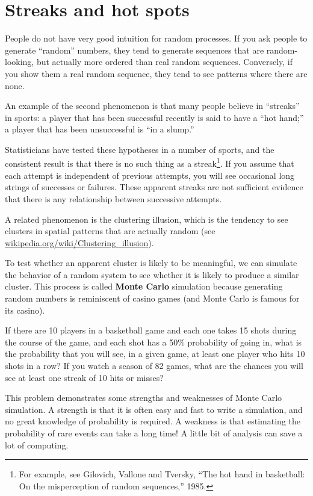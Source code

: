 \documentclass[12pt]{book}
\begin{document}
\section{Streaks and hot spots}

People do not have very good intuition for random processes.  If you
ask people to generate ``random'' numbers, they tend to generate
sequences that are random-looking, but actually more ordered than real
random sequences.  Conversely, if you show them a real random
sequence, they tend to see patterns where there are none.

An example of the second phenomenon is that many people believe
in ``streaks'' in sports: a player that has been successful recently
is said to have a ``hot hand;'' a player that has been unsuccessful is
``in a slump.''


Statisticians have tested these hypotheses in a number of sports, and
the consistent result is that there is no such thing as a
streak\footnote{For example, see Gilovich, Vallone and Tversky, ``The
  hot hand in basketball: On the misperception of random sequences,''
  1985.}.  If you assume that each attempt is independent of previous
attempts, you will see occasional long strings of successes or
failures.  These apparent streaks are not sufficient evidence that
there is any relationship between successive attempts.


A related phenomenon is the clustering illusion, which is the
tendency to see clusters in spatial patterns that are actually
random (see \url{wikipedia.org/wiki/Clustering_illusion}).


To test whether an apparent
cluster is likely to be meaningful, we can simulate the behavior
of a random system to see whether it is likely to produce a similar
cluster.  This process is called {\bf Monte Carlo} simulation because
generating random numbers is reminiscent of casino games (and Monte
Carlo is famous for its casino).

\begin{ex}


If there are 10 players in a basketball game and each one takes
15 shots during the course of the game, and each shot has a
50\% probability of going in, what is the probability that 
you will see, in a given game, at least one player who
hits 10 shots in a row?  If you watch a season of 82 games,
what are the chances you will see at least one streak of
10 hits or misses?

This problem demonstrates some strengths and weaknesses of Monte
Carlo simulation.  A strength is that it is often easy and fast
to write a simulation, and no great knowledge of probability is
required.  A weakness is that estimating the probability of
rare events can take a long time!  A little bit of analysis can
save a lot of computing.

\end{ex}
\end{document}
